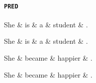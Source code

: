 \paragraph{\texttt{PRED}}
\begin{minipage}[b]{0.5\linewidth}
\begin{dependency}
	\begin{deptext}
	She \& is \& a \& student \& .\\
	\end{deptext}
\end{dependency}
\end{minipage}
\begin{minipage}[b]{0.5\linewidth}
\begin{dependency}
	\begin{deptext}
	She \& is \& a \& student \& .\\
	\end{deptext}
\end{dependency}
\end{minipage}

\begin{minipage}[b]{0.5\linewidth}
\begin{dependency}
	\begin{deptext}
	She \& became \& happier \& .\\
	\end{deptext}
\end{dependency}
\end{minipage}
\begin{minipage}[b]{0.5\linewidth}
\begin{dependency}
	\begin{deptext}
	She \& became \& happier \& .\\
	\end{deptext}
\end{dependency}
\end{minipage}
